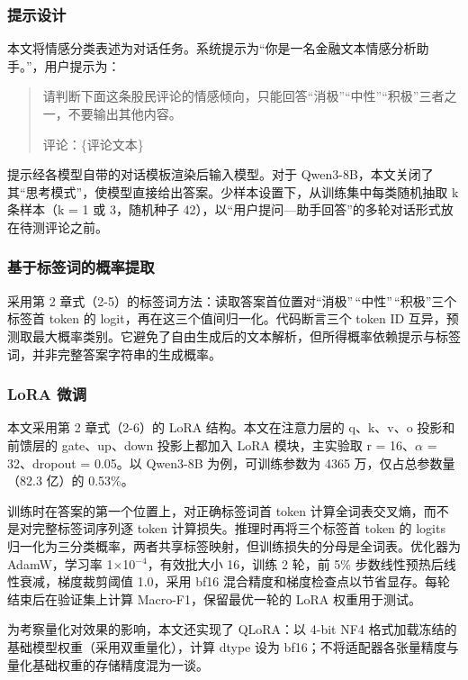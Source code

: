 \subsubsection{提示设计}

本文将情感分类表述为对话任务。系统提示为``你是一名金融文本情感分析助手。''，用户提示为：

\begin{quote}\small 请判断下面这条股民评论的情感倾向，只能回答“消极”“中性”“积极”三者之一，不要输出其他内容。\par 评论：\{评论文本\}\end{quote}

提示经各模型自带的对话模板渲染后输入模型。对于 Qwen3-8B，本文关闭了其``思考模式''，使模型直接给出答案。少样本设置下，从训练集中每类随机抽取 k 条样本（k = 1 或 3，随机种子 42），以``用户提问---助手回答''的多轮对话形式放在待测评论之前。

\subsubsection{基于标签词的概率提取}

采用第 2 章式（2-5）的标签词方法：读取答案首位置对``消极''\,``中性''\,``积极''三个标签首 token 的 logit，再在这三个值间归一化。代码断言三个 token ID 互异，预测取最大概率类别。它避免了自由生成后的文本解析，但所得概率依赖提示与标签词，并非完整答案字符串的生成概率。

\subsubsection{LoRA 微调}

本文采用第 2 章式（2-6）的 LoRA 结构。本文在注意力层的 q、k、v、o 投影和前馈层的 gate、up、down 投影上都加入 LoRA 模块，主实验取 r = 16、\(\alpha\) = 32、dropout = 0.05。以 Qwen3-8B 为例，可训练参数为 4365 万，仅占总参数量（82.3 亿）的 0.53\%。

训练时在答案的第一个位置上，对正确标签词首 token 计算全词表交叉熵，而不是对完整标签词序列逐 token 计算损失。推理时再将三个标签首 token 的 logits 归一化为三分类概率，两者共享标签映射，但训练损失的分母是全词表。优化器为 AdamW，学习率 1\(\times\)10\(^{-4}\)，有效批大小 16，训练 2 轮，前 5\% 步数线性预热后线性衰减，梯度裁剪阈值 1.0，采用 bf16 混合精度和梯度检查点以节省显存。每轮结束后在验证集上计算 Macro-F1，保留最优一轮的 LoRA 权重用于测试。

为考察量化对效果的影响，本文还实现了 QLoRA\cite{ref15}：以 4-bit NF4 格式加载冻结的基础模型权重（采用双重量化），计算 dtype 设为 bf16；不将适配器各张量精度与量化基础权重的存储精度混为一谈。


